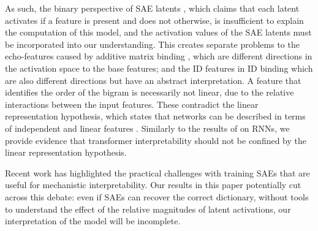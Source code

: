 As such, the binary perspective of SAE latents \citep{quirke2025binary, paulo2024automatically}, which claims that each latent activates if a feature is present and does not otherwise, is insufficient to explain the computation of this model, and the activation values of the SAE latents must be incorporated into our understanding. This creates separate problems to the echo-features caused by additive matrix binding \citep{wattenberg2024relational}, which are different directions in the activation space to the base features; and the ID features in ID binding \citep{feng2023language} which are also different directions but have an abstract interpretation. A feature that identifies the order of the bigram is necessarily not linear, due to the relative interactions between the input features. These contradict the linear representation hypothesis, which states that networks can be described in terms of independent and linear features \citep{elhage2022toy}. Similarly to the results of \citet{csordas-etal-2024-recurrent} on RNNs, we provide evidence that transformer interpretability should not be confined by the linear representation hypothesis.

Recent work \citep{leask2025inference, chanin2024absorption} has highlighted the practical challenges with training SAEs that are useful for mechanistic interpretability. Our results in this paper potentially cut across this debate: even if SAEs can recover the correct dictionary, without tools to understand the effect of the relative magnitudes of latent activations, our interpretation of the model will be incomplete.